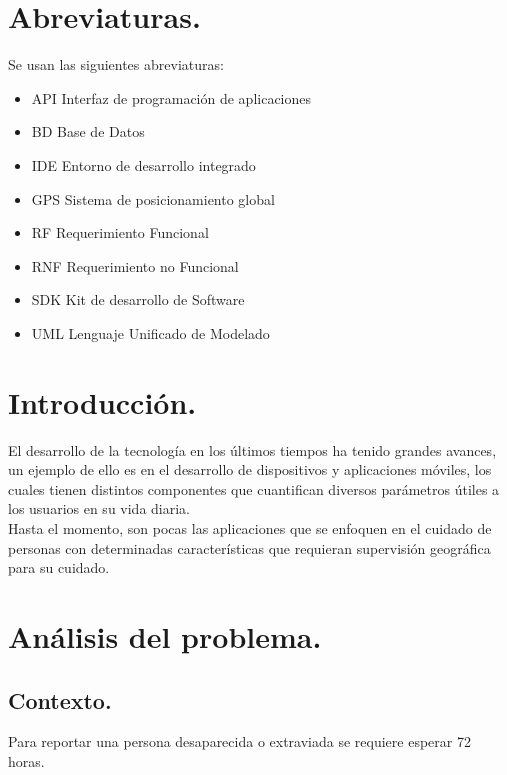 
\newpage
\section{Abreviaturas.}
Se usan las siguientes abreviaturas: \\
\begin{itemize}
\item API		Interfaz de programación de aplicaciones \\
\item BD		Base de Datos\\
\item IDE		Entorno de desarrollo integrado\\ 
\item GPS		Sistema de posicionamiento global\\
\item RF		Requerimiento Funcional\\
\item RNF		Requerimiento no Funcional\\
\item SDK		Kit de desarrollo de Software\\ 
\item UML		Lenguaje Unificado de Modelado 
\end{itemize}
\section{Introducción.}
El desarrollo de la tecnología en los últimos tiempos ha tenido grandes avances, un ejemplo de ello es en el desarrollo de dispositivos y aplicaciones móviles, los cuales tienen distintos componentes que cuantifican diversos parámetros útiles a los usuarios en su vida diaria. \\

Hasta el momento, son pocas las aplicaciones que se enfoquen en el cuidado de personas con determinadas características que requieran supervisión geográfica para su cuidado.

\newpage 
\section{Análisis del problema.}
\subsection{Contexto.}
Para reportar una persona desaparecida o extraviada se requiere esperar 72 horas. \\

